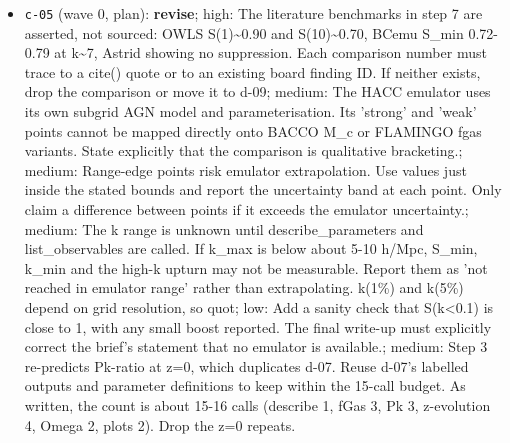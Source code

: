 \documentclass[11pt,a4paper]{article}
\begin{document}
\begin{itemize}
  \item \texttt{c-05} (wave 0, plan): \textbf{revise}; high: The literature benchmarks in step 7 are asserted, not sourced: OWLS S(1)\textasciitilde{}0.90 and S(10)\textasciitilde{}0.70, BCemu S\_min 0.72-0.79 at k\textasciitilde{}7, Astrid showing no suppression. Each comparison number must trace to a cite() quote or to an existing board finding ID. If neither exists, drop the comparison or move it to d-09; medium: The HACC emulator uses its own subgrid AGN model and parameterisation. Its 'strong' and 'weak' points cannot be mapped directly onto BACCO M\_c or FLAMINGO fgas variants. State explicitly that the comparison is qualitative bracketing.; medium: Range-edge points risk emulator extrapolation. Use values just inside the stated bounds and report the uncertainty band at each point. Only claim a difference between points if it exceeds the emulator uncertainty.; medium: The k range is unknown until describe\_parameters and list\_observables are called. If k\_max is below about 5-10 h/Mpc, S\_min, k\_min and the high-k upturn may not be measurable. Report them as 'not reached in emulator range' rather than extrapolating. k(1\%) and k(5\%) depend on grid resolution, so quot; low: Add a sanity check that S(k\textless{}0.1) is close to 1, with any small boost reported. The final write-up must explicitly correct the brief's statement that no emulator is available.; medium: Step 3 re-predicts Pk-ratio at z=0, which duplicates d-07. Reuse d-07's labelled outputs and parameter definitions to keep within the 15-call budget. As written, the count is about 15-16 calls (describe 1, fGas 3, Pk 3, z-evolution 4, Omega 2, plots 2). Drop the z=0 repeats.

\end{itemize}
\end{document}
